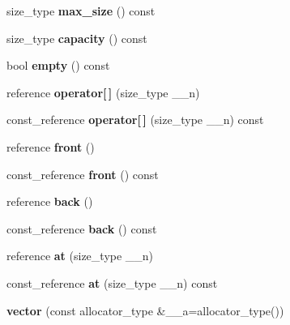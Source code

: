 \begin{DoxyCompactItemize}
size\+\_\+type {\bfseries max\+\_\+size} () const
\item 
\mbox{\label{structvector_a53e2ba58c4c130fd560f526637a2154b}} 
size\+\_\+type {\bfseries capacity} () const
\item 
\mbox{\label{structvector_ab9a783d8d91734251c0b46c6adf20180}} 
bool {\bfseries empty} () const
\item 
\mbox{\label{structvector_a62f3e2125fac1d84617c6b33c128843a}} 
reference {\bfseries operator\mbox{[}$\,$\mbox{]}} (size\+\_\+type \+\_\+\+\_\+n)
\item 
\mbox{\label{structvector_acac936491ad02cb1e4c218399f380545}} 
const\+\_\+reference {\bfseries operator\mbox{[}$\,$\mbox{]}} (size\+\_\+type \+\_\+\+\_\+n) const
\item 
\mbox{\label{structvector_a66b28c19e75658deb328ef3833997032}} 
reference {\bfseries front} ()
\item 
\mbox{\label{structvector_a96ceb5fda806c57779fdf6205e9cde9d}} 
const\+\_\+reference {\bfseries front} () const
\item 
\mbox{\label{structvector_a3652040e07cee889a7bd4efee5f18532}} 
reference {\bfseries back} ()
\item 
\mbox{\label{structvector_afc391e6b19dc3624fe9f017844a54ce6}} 
const\+\_\+reference {\bfseries back} () const
\item 
\mbox{\label{structvector_aa87917d77fcc1920cc26b8335e52db4b}} 
reference {\bfseries at} (size\+\_\+type \+\_\+\+\_\+n)
\item 
\mbox{\label{structvector_adee4d05f69a240fba15456cde96efa7e}} 
const\+\_\+reference {\bfseries at} (size\+\_\+type \+\_\+\+\_\+n) const
\item 
\mbox{\label{structvector_a742ee2395e0ccfd466fc7facb0cbff0e}} 
{\bfseries vector} (const allocator\+\_\+type \&\+\_\+\+\_\+a=allocator\+\_\+type())
\item 
\mbox{\label{structvector_aa6029f3be1696e047807421ae62cd27f}} 

\end{DoxyCompactItemize}
